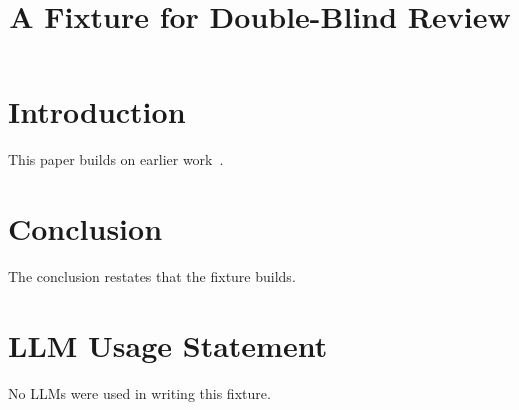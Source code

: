 \documentclass[conference,compsoc]{IEEEtran}
\begin{document}
\title{A Fixture for Double-Blind Review}
\author{}
\maketitle
\section{Introduction}
This paper builds on earlier work~\cite{knuth84}.

\section{Conclusion}
The conclusion restates that the fixture builds.


\section*{LLM Usage Statement}
No LLMs were used in writing this fixture.
\end{document}
